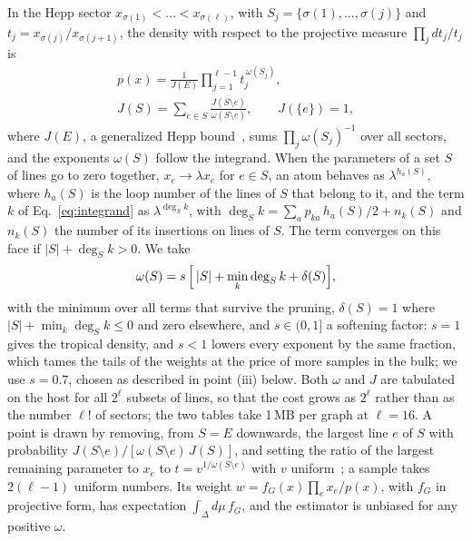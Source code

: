 In the Hepp sector $x_{\sigma(1)}<\dots<x_{\sigma(\ell)}$, with $S_j=\{\sigma(1),\dots,\sigma(j)\}$ and
$t_j=x_{\sigma(j)}/x_{\sigma(j+1)}$, the density with respect to the projective measure $\prod_j dt_j/t_j$ is
\begin{gather}
p(x)=\frac{1}{J(E)}\prod_{j=1}^{\ell-1}t_j^{\,\omega(S_j)},\nonumber\\
J(S)=\sum_{e\in S}\frac{J(S\setminus e)}{\omega(S\setminus e)},\qquad J(\{e\})=1 ,
\label{eq:tropical}
\end{gather}
where $J(E)$, a generalized Hepp bound~\cite{Panzer2022Hepp}, sums $\prod_j\omega(S_j)^{-1}$ over all sectors, and the
exponents $\omega(S)$ follow the integrand. When the parameters of a set $S$ of lines go to zero together,
$x_e\to\lambda x_e$ for $e\in S$, an atom behaves as $\lambda^{h_a(S)}$, where $h_a(S)$ is the loop number of the
lines of $S$ that belong to it, and the term $k$ of Eq.~\eqref{eq:integrand} as $\lambda^{\deg_S k}$, with
$\deg_S k=\sum_a p_{ka}\,h_a(S)/2+n_{k}(S)$ and $n_k(S)$ the number of its insertions on lines of $S$. The term
converges on this face if $|S|+\deg_S k>0$. We take
\begin{equation}
\omega(S)=s\,\Bigl[\,|S|+\min_k\deg_S k+\delta(S)\Bigr],
\label{eq:omega}
\end{equation}
with the minimum over all terms that survive the pruning, $\delta(S)=1$ where $|S|+\min_k\deg_S k\le0$ and zero
elsewhere, and $s\in(0,1]$ a softening factor: $s=1$ gives the tropical density, and $s<1$ lowers every exponent by the
same fraction, which tames the tails of the weights at the price of more samples in the bulk; we use $s=0.7$, chosen as
described in point (iii) below. Both
$\omega$ and $J$ are tabulated on the host for all $2^\ell$ subsets of lines, so that the cost grows as $2^\ell$ rather
than as the number $\ell!$ of sectors; the two tables take 1\,MB per graph at $\ell=16$. A point is drawn by removing, from
$S=E$ downwards, the largest line $e$ of $S$ with probability $J(S\setminus e)/[\omega(S\setminus e)\,J(S)]$, and setting
the ratio of the largest remaining parameter to $x_e$ to $t=v^{1/\omega(S\setminus e)}$ with $v$ uniform~\cite{Borinsky2023tropical};
a sample takes $2(\ell-1)$ uniform numbers. Its weight $w=f_G(x)\prod_e x_e/p(x)$, with $f_G$ in projective form, has expectation
$\int_\Delta d\mu\,f_G$, and the estimator is unbiased for any positive $\omega$.

